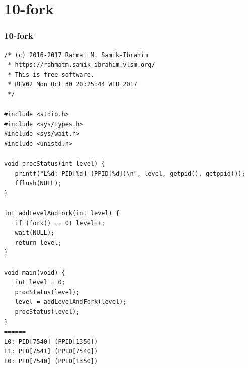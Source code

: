 \documentclass[xcolor=table, notheorems, hyperref={pdfpagelabels=false}]{beamer}
\begin{document}
\section{10-fork}
\begin{frame}[fragile]
\frametitle{10-fork}
\begin{lstlisting}[basicstyle=\ttfamily\tiny]
/* (c) 2016-2017 Rahmat M. Samik-Ibrahim
 * https://rahmatm.samik-ibrahim.vlsm.org/
 * This is free software.
 * REV02 Mon Oct 30 20:25:44 WIB 2017
 */

#include <stdio.h>
#include <sys/types.h>
#include <sys/wait.h>
#include <unistd.h>

void procStatus(int level) {
   printf("L%d: PID[%d] (PPID[%d])\n", level, getpid(), getppid());
   fflush(NULL);
}

int addLevelAndFork(int level) {
   if (fork() == 0) level++;
   wait(NULL);
   return level;
}

void main(void) {
   int level = 0;
   procStatus(level);
   level = addLevelAndFork(level);
   procStatus(level);
}
======
L0: PID[7540] (PPID[1350])
L1: PID[7541] (PPID[7540])
L0: PID[7540] (PPID[1350])

\end{lstlisting}
\end{frame}

\end{document}
